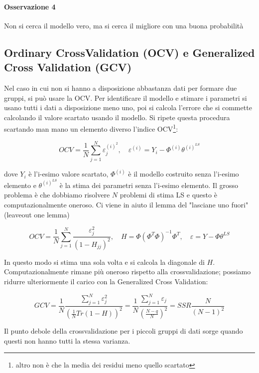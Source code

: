 \paragraph{Osservazione 4} Non si cerca il modello vero, ma si cerca il migliore con una buona probabilità
\subsection{Ordinary CrossValidation (OCV) e Generalized Cross Validation (GCV)}
Nel caso in cui non si hanno a disposizione abbastanza dati per formare due gruppi, si può usare la OCV. Per identificare il modello e stimare i parametri si usano tutti i dati a disposizione meno uno, poi si calcola l'errore che si commette calcolando il valore scartato usando il modello. Si ripete questa procedura scartando man mano un elemento diverso l'indice OCV\footnote{altro non è che la media dei residui meno quello scartato}:

    \[ OCV=\frac{1}{N}\sum_{j=1}^{N}{\varepsilon_j^{(i)^2}},  \quad    {\varepsilon^{(i)}}=Y_i-\Phi^{(i)}\theta^{(i)^{LS}} \]

dove $Y_i$ è l'i-esimo valore scartato, $\Phi^{(i)}$ è il modello costruito senza l'i-esimo elemento e $\theta^{(i)^{LS}}$ è la stima dei parametri senza l'i-esimo elemento.\newline
Il grosso problema è che dobbiamo risolvere $N$ problemi di stima LS e questo è computazionalmente oneroso. Ci viene in aiuto il lemma del "lasciane uno fuori" (leaveout one lemma)

    \[ OCV=\frac{1}{N}\sum_{j=1}^{N}\frac{\varepsilon_j^2}{(1-H_{jj})^2}, \quad  H=\Phi(\Phi^T\Phi)^{-1}\Phi^T,  \quad  \varepsilon=Y-\Phi\theta^{LS} \]

In questo modo si stima una sola volta e si calcola la diagonale di $H$. Computazionalmente rimane più oneroso rispetto alla crossvalidazione; possiamo ridurre ulteriormente il carico con la Generalized Cross Validation:

    \[ GCV=\frac{1}{N}\frac{\sum_{j=1}^{N}{\varepsilon_j^2}}{(\frac{1}{N}Tr(1-H))^2}=\frac{1}{N}\frac{\sum_{j=1}^{N}{\varepsilon_j}}{(\frac{N-q}{N})^2}=SSR\frac{N}{(N-1)^2} \]

Il punto debole della crossvalidazione per i piccoli gruppi di dati sorge quando questi non hanno tutti la stessa varianza.
